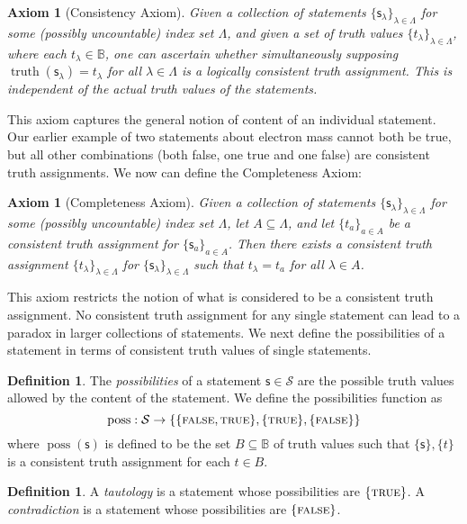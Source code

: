 \documentclass[psamsfonts]{amsart}
\newtheorem{axiom}[thm]{Axiom}
\theoremstyle{definition}
\newtheorem{defn}[thm]{Definition}
\theoremstyle{remark}
\numberwithin{equation}{section}
\DeclareMathOperator{\truth}{truth}
\DeclareMathOperator{\possFn}{poss}
\def\TRUE{\textsc{true}}
\def\FALSE{\textsc{false}}
\newcommand{\stmt}[1][s] {\mathsf{#1}}
\begin{document}
\begin{axiom}[Consistency Axiom]
\label{consistent}
Given a collection of statements $\{\stmt_{\lambda}\}_{\lambda\in\Lambda}$ for some (possibly uncountable) index set $\Lambda$, and given a set of truth values $\{t_{\lambda}\}_{\lambda\in\Lambda}$, where each $t_{\lambda}\in\mathbb{B}$, one can ascertain whether simultaneously supposing $\truth(\stmt_{\lambda}) = t_{\lambda}$ for all $\lambda\in\Lambda$ is a logically \emph{consistent truth assignment}. This is independent of the actual truth values of the statements. 
\end{axiom}

This axiom captures the general notion of content of an individual statement. Our earlier example of two statements about electron mass cannot both be true, but all other combinations (both false, one true and one false) are consistent truth assignments. 
We now can define the Completeness Axiom:


\begin{axiom}[Completeness Axiom]
\label{completeness}
Given a collection of statements $\{\stmt_{\lambda}\}_{\lambda\in\Lambda}$ for some (possibly uncountable) index set $\Lambda$, let $A\subseteq\Lambda$, and let $\{t_a\}_{a\in A}$ be a consistent truth assignment for $\{\stmt_a\}_{a\in A}$. Then there exists a consistent truth assignment $\{t_{\lambda}\}_{\lambda\in\Lambda}$ for $\{\stmt_{\lambda}\}_{\lambda\in\Lambda}$ such that $t_{\lambda} = t_a$ for all $\lambda\in A$. 
\end{axiom}
This axiom restricts the notion of what is considered to be a consistent truth assignment. No consistent truth assignment for any single statement can lead to a paradox in larger collections of statements. We next define the possibilities of a statement in terms of consistent truth values of single statements.

\begin{defn}
The \emph{possibilities} of a statement $\stmt\in\mathcal{S}$ are the possible truth values allowed by the content of the statement. We define the possibilities function as
$$
\possFn:\mathcal{S}\to\{\{\FALSE,\TRUE\},\{\TRUE\},\{\FALSE\}\}
$$
where $\possFn(\stmt)$ is defined to be the set $B\subseteq\mathbb{B}$ of truth values such that $\{\stmt\},\{t\}$ is a consistent truth assignment for each $t\in B$. 
\end{defn}


\begin{defn}
A \emph{tautology} is a statement whose possibilities are $\{\TRUE\}$. A \emph{contradiction} is a statement whose possibilities are $\{\FALSE\}$. 
\end{defn}
\end{document}
